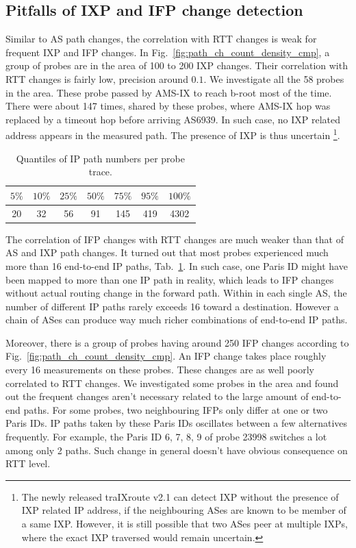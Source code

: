 \subsection{Pitfalls of IXP and IFP change detection}
Similar to AS path changes, the correlation with RTT changes is weak for frequent IXP and IFP changes.
In Fig.~\ref{fig:path_ch_count_density_cmp}, a group of probes are in the area of 100 to 200 IXP changes. Their correlation with RTT changes is fairly low, precision  around $0.1$.
We investigate all the 58 probes in the area. These probe passed by AMS-IX to reach b-root most of the time. There were about 147 times, shared by these probes, where AMS-IX hop was replaced by a timeout hop before arriving AS6939.
In such case, no IXP related address appears in the measured path. The presence of IXP is thus uncertain \footnote{The newly released traIXroute v2.1 can detect IXP without the presence of IXP related IP address, if the neighbouring ASes are known to be member of a same IXP. However, it is still possible that two ASes peer at multiple IXPs, where the exact IXP traversed would remain uncertain.}.

\begin{table}[!htb]
\caption{Quantiles of IP path numbers per probe trace.}
\label{tab:ip_path_count}
\centering
\footnotesize
\setlength{\tabcolsep}{0.5em}
\begin{tabular}{ccccccc}
\toprule
$5\%$ & $10\%$ & $25\%$ & $50\%$ & $75\%$ & $95\%$ & $100\%$\\
\midrule
20 & 32 & 56 & 91 & 145 & 419 & 4302\\
\bottomrule
\end{tabular}
\end{table}

The correlation of IFP changes with RTT changes are much weaker than that of AS and IXP path changes.
It turned out that most probes experienced much more than 16 end-to-end IP paths, Tab.~\ref{tab:ip_path_count}.
In such case, one Paris ID might have been mapped to more than one IP path in reality, which leads to IFP changes without actual routing change in the forward path.
Within in each single AS, the number of different IP paths rarely exceeds 16 toward a destination. However a chain of ASes can produce way much richer combinations of end-to-end IP paths.

Moreover, there is a group of probes having around 250 IFP changes according to Fig.~\ref{fig:path_ch_count_density_cmp}.
An IFP change takes place roughly every 16 measurements on these probes. 
These changes are as well poorly correlated to RTT changes.
We investigated some probes in the area and found out the frequent changes aren't necessary related to the large amount of end-to-end paths.
For some probes, two neighbouring IFPs only differ at one or two Paris IDs.
IP paths taken by these Paris IDs oscillates between a few alternatives frequently.
For example, the Paris ID 6, 7, 8, 9 of probe 23998 switches a lot among only 2 paths.
Such change in general doesn't have obvious consequence on RTT level.

